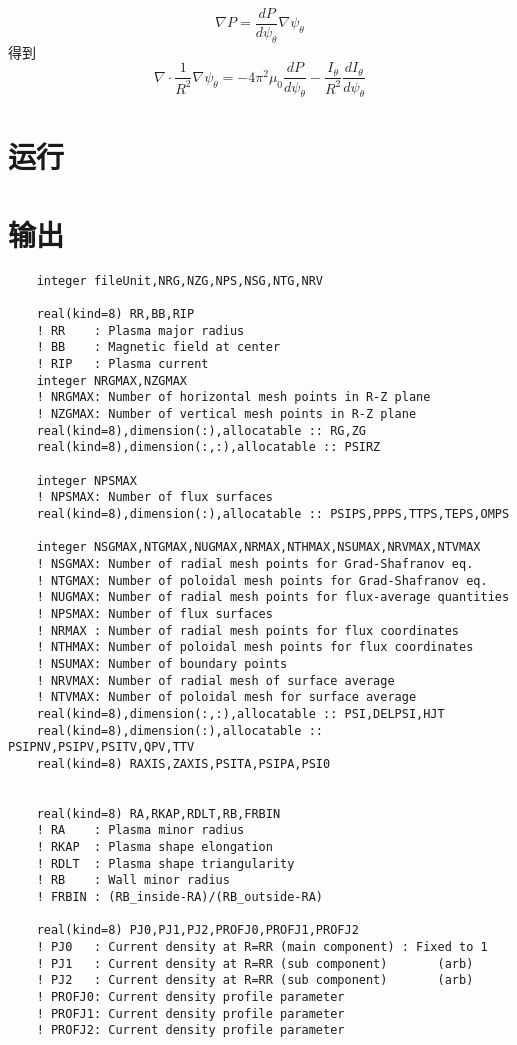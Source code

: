 \documentclass[11pt,a4paper]{article}
\begin{document}
	$$
	\nabla{P}=\frac{dP}{d\psi_\theta}\nabla{\psi_\theta}
	$$
	得到
	$$
	\nabla\cdot\frac{1}{R^2}\nabla\psi_\theta=-4\pi^2\mu_0\frac{dP}{d\psi_\theta}-\frac{I_\theta}{R^2}\frac{dI_\theta}{d\psi_\theta}
	$$
	

	\section{运行}


	
	\section{输出}
	
	\begin{lstlisting}
    integer fileUnit,NRG,NZG,NPS,NSG,NTG,NRV
	
	real(kind=8) RR,BB,RIP
	! RR    : Plasma major radius
	! BB    : Magnetic field at center
	! RIP   : Plasma current
	integer NRGMAX,NZGMAX
	! NRGMAX: Number of horizontal mesh points in R-Z plane
	! NZGMAX: Number of vertical mesh points in R-Z plane
	real(kind=8),dimension(:),allocatable :: RG,ZG
	real(kind=8),dimension(:,:),allocatable :: PSIRZ
	
	integer NPSMAX
	! NPSMAX: Number of flux surfaces
	real(kind=8),dimension(:),allocatable :: PSIPS,PPPS,TTPS,TEPS,OMPS
	
	integer NSGMAX,NTGMAX,NUGMAX,NRMAX,NTHMAX,NSUMAX,NRVMAX,NTVMAX
	! NSGMAX: Number of radial mesh points for Grad-Shafranov eq.
	! NTGMAX: Number of poloidal mesh points for Grad-Shafranov eq.
	! NUGMAX: Number of radial mesh points for flux-average quantities
	! NPSMAX: Number of flux surfaces
	! NRMAX : Number of radial mesh points for flux coordinates
	! NTHMAX: Number of poloidal mesh points for flux coordinates
	! NSUMAX: Number of boundary points
	! NRVMAX: Number of radial mesh of surface average
	! NTVMAX: Number of poloidal mesh for surface average
	real(kind=8),dimension(:,:),allocatable :: PSI,DELPSI,HJT
	real(kind=8),dimension(:),allocatable :: PSIPNV,PSIPV,PSITV,QPV,TTV
	real(kind=8) RAXIS,ZAXIS,PSITA,PSIPA,PSI0
	
	
	real(kind=8) RA,RKAP,RDLT,RB,FRBIN
	! RA    : Plasma minor radius
	! RKAP  : Plasma shape elongation
	! RDLT  : Plasma shape triangularity
	! RB    : Wall minor radius
	! FRBIN : (RB_inside-RA)/(RB_outside-RA)
	
	real(kind=8) PJ0,PJ1,PJ2,PROFJ0,PROFJ1,PROFJ2
	! PJ0   : Current density at R=RR (main component) : Fixed to 1
	! PJ1   : Current density at R=RR (sub component)       (arb)
	! PJ2   : Current density at R=RR (sub component)       (arb)
	! PROFJ0: Current density profile parameter
	! PROFJ1: Current density profile parameter
	! PROFJ2: Current density profile parameter
	

\end{lstlisting}
\end{document}
